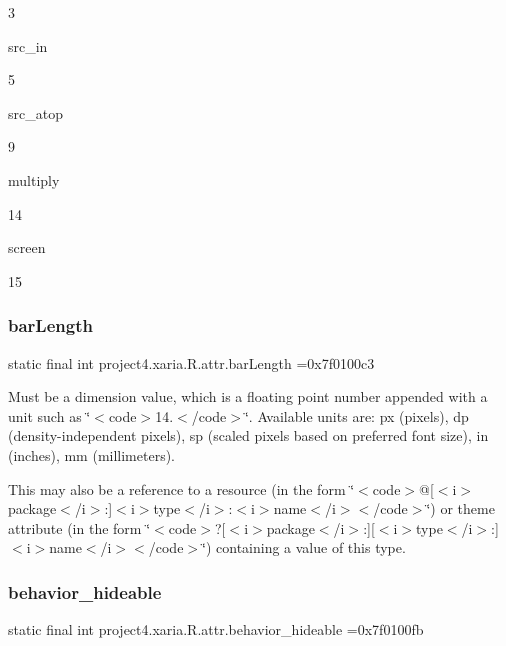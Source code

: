 3

{\ttfamily src\+\_\+in}

5

{\ttfamily src\+\_\+atop}

9

{\ttfamily multiply}

14

{\ttfamily screen}

15\mbox{\label{classproject4_1_1xaria_1_1R_1_1attr_a01400ab5569fe32a1b367eb6dc3a1c46}} 
\subsubsection{\texorpdfstring{bar\+Length}{barLength}}
{\footnotesize\ttfamily static final int project4.\+xaria.\+R.\+attr.\+bar\+Length =0x7f0100c3\hspace{0.3cm}{\ttfamily [static]}}

Must be a dimension value, which is a floating point number appended with a unit such as \char`\"{}$<$code$>$14.\+5sp$<$/code$>$\char`\"{}. Available units are\+: px (pixels), dp (density-\/independent pixels), sp (scaled pixels based on preferred font size), in (inches), mm (millimeters). 

This may also be a reference to a resource (in the form \char`\"{}$<$code$>$@\mbox{[}$<$i$>$package$<$/i$>$\+:\mbox{]}$<$i$>$type$<$/i$>$\+:$<$i$>$name$<$/i$>$$<$/code$>$\char`\"{}) or theme attribute (in the form \char`\"{}$<$code$>$?\mbox{[}$<$i$>$package$<$/i$>$\+:\mbox{]}\mbox{[}$<$i$>$type$<$/i$>$\+:\mbox{]}$<$i$>$name$<$/i$>$$<$/code$>$\char`\"{}) containing a value of this type. \mbox{\label{classproject4_1_1xaria_1_1R_1_1attr_ae583986bc4ae618babdbb0e597fde220}} 
\subsubsection{\texorpdfstring{behavior\+\_\+hideable}{behavior\_hideable}}
{\footnotesize\ttfamily static final int project4.\+xaria.\+R.\+attr.\+behavior\+\_\+hideable =0x7f0100fb\hspace{0.3cm}{\ttfamily [static]}}

